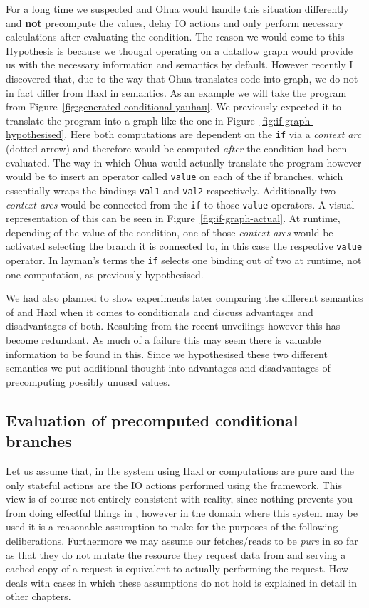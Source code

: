 For a long time we suspected \yauhau{} and Ohua would handle this situation differently and \textbf{not} precompute the values, delay IO actions and only perform necessary calculations after evaluating the condition.
The reason we would come to this Hypothesis is because we thought operating on a dataflow graph would provide us with the necessary information and semantics by default.
However recently I discovered that, due to the way that Ohua translates code into graph, we do not in fact differ from Haxl in semantics.
As an example we will take the program from Figure~\ref{fig:generated-conditional-yauhau}.
We previously expected it to translate the program into a graph like the one in Figure~\ref{fig:if-graph-hypothesised}.
Here both computations are dependent on the \texttt{if} via a \textit{context arc} (dotted arrow) and therefore would be computed \textit{after} the condition had been evaluated.
The way in which Ohua would actually translate the program however would be to insert an operator called \texttt{value} on each of the if branches, which essentially wraps the bindings \texttt{val1} and \texttt{val2} respectively.
Additionally two \textit{context arcs} would be connected from the \texttt{if} to those \texttt{value} operators.
A visual representation of this can be seen in Figure~\ref{fig:if-graph-actual}.
At runtime, depending of the value of the condition, one of those \textit{context arcs} would be activated selecting the branch it is connected to, in this case the respective \texttt{value} operator.
In layman's terms the \texttt{if} selects one binding out of two at runtime, not one computation, as previously hypothesised.

We had also planned to show experiments later comparing the different semantics of \yauhau{} and Haxl when it comes to conditionals and discuss advantages and disadvantages of both.
Resulting from the recent unveilings however this has become redundant.
As much of a failure this may seem there is valuable information to be found in this.
Since we hypothesised these two different semantics we put additional thought into advantages and disadvantages of precomputing possibly unused values.


\subsection{Evaluation of precomputed conditional branches}

Let us assume that, in the system using Haxl or \yauhau{} computations are pure and the only stateful actions are the IO actions performed using the framework.
This view is of course not entirely consistent with reality, since nothing prevents you from doing effectful things in \yauhau{}, however in the domain where this system may be used it is a reasonable assumption to make for the purposes of the following deliberations.
Furthermore we may assume our fetches/reads to be \textit{pure} in so far as that they do not mutate the resource they request data from and serving a cached copy of a request is equivalent to actually performing the request.
How \yauhau{} deals with cases in which these assumptions do not hold is explained in detail in other chapters.

